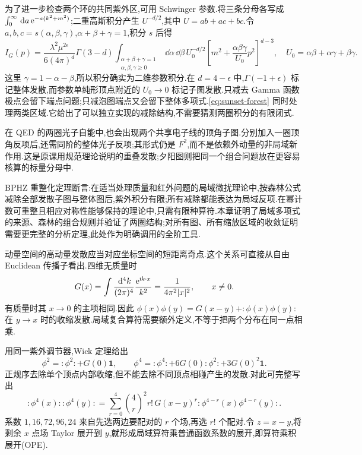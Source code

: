 \begin{solution}
为了进一步检查两个环的共同紫外区,可用 Schwinger 参数.将三条分母各写成 $\int_0^\infty\,\mathrm d a\,\mathrm e^{-a(k^2+m^2)}$;二重高斯积分产生 $U^{-d/2}$,其中 $U=ab+ac+bc$.令 $a,b,c=s(\alpha,\beta,\gamma)$,$\alpha+\beta+\gamma=1$,积分 $s$ 后得
\begin{equation}
 I_G(p)=\frac{\lambda^2\mu^{2\epsilon}}{6(4\pi)^d}
 \Gamma(3-d)\int_{\substack{\alpha+\beta+\gamma=1\\\alpha,\beta,\gamma\geq0}}
 \dd\alpha\,\dd\beta\,
 U_0^{-d/2}
 \left[m^2+\frac{\alpha\beta\gamma}{U_0}p^2\right]^{d-3},
 \quad U_0=\alpha\beta+\alpha\gamma+\beta\gamma.
 \label{eq:sunset-schwinger}
\end{equation}
这里 $\gamma=1-\alpha-\beta$,所以积分确实为二维参数积分.在 $d=4-\epsilon$ 中,$\Gamma(-1+\epsilon)$ 标记整体发散,而参数单纯形顶点附近的 $U_0\to0$ 标记子图发散.只减去 Gamma 函数极点会留下端点问题;只减泡图端点又会留下整体多项式.\eqref{eq:sunset-forest} 同时处理两类区域.它给出了可以独立实现的减除结构,不需要猜测两圈积分的有限闭式.
\end{solution}

在 QED 的两圈光子自能中,也会出现两个共享电子线的顶角子图.分别加入一圈顶角反项后,还需同阶的整体光子反项;其形式仍是 $F^2$,而不是依赖外动量的非局域新作用.这是原课用规范理论说明的重叠发散;夕阳图则把同一个组合问题放在更容易核算的标量分母中.

BPHZ 重整化定理断言:在适当处理质量和红外问题的局域微扰理论中,按森林公式减除全部发散子图与整体图后,紫外积分有限;所有减除都能表达为局域反项.在幂计数可重整且相应对称性能够保持的理论中,只需有限种算符.本章证明了局域多项式的来源、森林的组合规则并验证了两圈结构;对所有图、所有缩放区域的收敛证明需要更完整的分析定理,此处作为明确调用的全阶工具.


动量空间的高动量发散应当对应坐标空间的短距离奇点.这个关系可直接从自由 Euclidean 传播子看出.四维无质量时
\begin{equation}
 G(x)=\int\frac{\,\mathrm d^4k}{(2\pi)^4}\frac{\mathrm e^{\mathrm i k\cdot x}}{k^2}
       =\frac1{4\pi^2|x|^2},\qquad x\ne0.
\end{equation}
有质量时其 $x\to0$ 的主项相同.因此 $\phi(x)\phi(y)=G(x-y)+:\phi(x)\phi(y):$ 在 $y\to x$ 时的收缩发散.局域复合算符需要额外定义,不等于把两个分布在同一点相乘.

用同一紫外调节器,Wick 定理给出
\begin{equation}
 \phi^2=:\phi^2:+G(0)\mathbf1,\qquad
 \phi^4=:\phi^4:+6G(0):\phi^2:+3G(0)^2\mathbf1.
\end{equation}
正规序去除单个顶点内部收缩,但不能去除不同顶点相碰产生的发散.对此可完整写出
\begin{equation}
 :\phi^4(x)::\phi^4(y):
 =\sum_{r=0}^4\binom4r^2r!\,G(x-y)^r
 :\phi^{4-r}(x)\phi^{4-r}(y):.
 \label{eq:phi4-ope-wick-exact}
\end{equation}
系数 $1,16,72,96,24$ 来自先选两边要配对的 $r$ 个场,再选 $r!$ 个配对.令 $z=x-y$,将剩余 $x$ 点场 Taylor 展开到 $y$,就形成局域算符乘普通函数系数的展开,即算符乘积展开(OPE).

